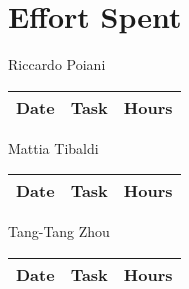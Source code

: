 \section{Effort Spent}

Riccardo Poiani
\begin{table}[H]
\begin{tabularx}{\textwidth}{|l|X|l|}
\hline
Date & Task & Hours\\ \hline
\end{tabularx}
\end{table}

Mattia Tibaldi
\begin{table}[H]
\begin{tabularx}{\textwidth}{|l|X|l|}
\hline
Date & Task & Hours\\ \hline
\end{tabularx}
\end{table}

Tang-Tang Zhou
\begin{table}[H]
\begin{tabularx}{\textwidth}{|l|X|l|}
\hline
Date & Task & Hours\\ \hline
\end{tabularx}
\end{table}